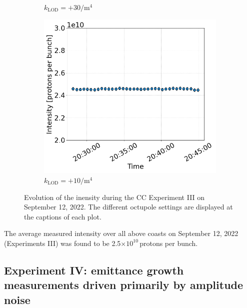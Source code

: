 \begin{figure}[htp]
\begin{subfigure}{.4\textwidth}
            \caption{$k_\mathrm{LOD}=+30 \mathrm{/m^{4}}$}
    \end{subfigure}
    \begin{subfigure}{.4\textwidth}
        \centering
        \includegraphics[width=.95\linewidth]{images/app_e/intensity_cc_md_12Sep22_coast_11.png}  
        \caption{$k_\mathrm{LOD}=+10  \mathrm{/m^{4}}$}
\end{subfigure}
    \caption{Evolution of the inensity during the CC Experiment III on September 12, 2022. The different octupole settings are displayed at the captions of each plot.}
    \label{fig:cc_md_sep_2022_overview_plots_klod_scan_intensity}
 \end{figure}

 The average measured intensity over all above coasts on September 12, 2022 (Experiments III) was found to be 2.5$\times 10^{10}$\,protons per bunch. 

\newpage


\subsection{Experiment IV: emittance growth measurements driven primarily by amplitude noise}\label{subsec:2022_exp4_intensity}


